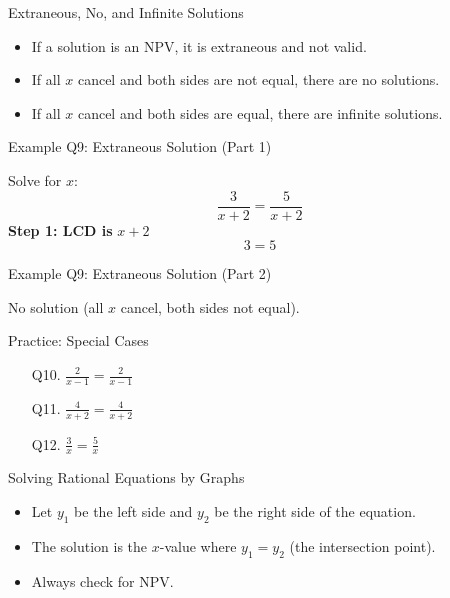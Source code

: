 \documentclass[aspectratio=169]{beamer}
\begin{document}
\begin{frame}{Extraneous, No, and Infinite Solutions}
\begin{tcolorbox}[colback=lightgray,colframe=primary,title=Special Cases]
\footnotesize
\begin{itemize}
  \item If a solution is an NPV, it is extraneous and not valid.
  \item If all $x$ cancel and both sides are not equal, there are no solutions.
  \item If all $x$ cancel and both sides are equal, there are infinite solutions.
\end{itemize}
\end{tcolorbox}
\end{frame}

\begin{frame}{Example Q9: Extraneous Solution (Part 1)}
\begin{tcolorbox}[colback=lightgray,colframe=secondary,title=Example Q9 (Part 1)]
\footnotesize
Solve for $x$:
\[
\frac{3}{x+2} = \frac{5}{x+2}
\]
\textbf{Step 1: LCD is } $x+2$
\[
3 = 5
\]
\end{tcolorbox}
\end{frame}

\begin{frame}{Example Q9: Extraneous Solution (Part 2)}
\begin{tcolorbox}[colback=lightgray,colframe=secondary,title=Example Q9 (Part 2)]
\footnotesize
No solution (all $x$ cancel, both sides not equal).
\end{tcolorbox}
\end{frame}

\begin{frame}{Practice: Special Cases}
\begin{tcolorbox}[colback=lightgray,colframe=primary,title=Practice Problems]
\footnotesize
\begin{enumerate}
  \item[Q10.] $\frac{2}{x-1} = \frac{2}{x-1}$
  \item[Q11.] $\frac{4}{x+2} = \frac{4}{x+2}$
  \item[Q12.] $\frac{3}{x} = \frac{5}{x}$
\end{enumerate}
\end{tcolorbox}
\end{frame}

\begin{frame}{Solving Rational Equations by Graphs}
\begin{tcolorbox}[colback=lightgray,colframe=primary,title=Graphical Solution]
\footnotesize
\begin{itemize}
  \item Let $y_1$ be the left side and $y_2$ be the right side of the equation.
  \item The solution is the $x$-value where $y_1 = y_2$ (the intersection point).
  \item Always check for NPV.
\end{itemize}
\end{tcolorbox}
\end{frame}
\end{document}
